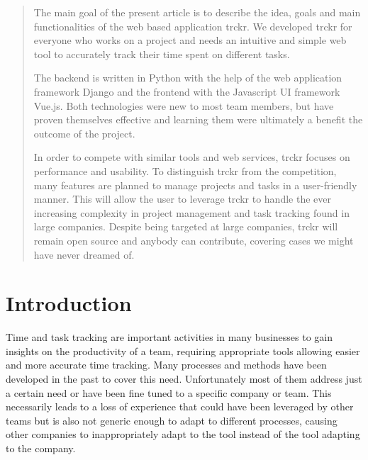 \documentclass[bibliography=totoc, listof=totocnumbered]{scrartcl}
\begin{document}

\begin{abstract}
  The main goal of the present article is to describe the idea, goals and main
  functionalities of the web based application trckr. We developed trckr for
  everyone who works on a project and needs an intuitive and simple web tool to
  accurately track their time spent on different tasks.

  The backend is written in Python with the help of the web application
  framework Django and the frontend with the Javascript UI framework Vue.js.
  Both technologies were new to most team members, but have proven themselves
  effective and learning them were ultimately a benefit the outcome of the
  project.

  In order to compete with similar tools and web services, trckr focuses on
  performance and usability. To distinguish trckr from the competition, many
  features are planned to manage projects and tasks in a user-friendly manner.
  This will allow the user to leverage trckr to handle the ever increasing
  complexity in project management and task tracking found in large companies.
  Despite being targeted at large companies, trckr will remain open source and
  anybody can contribute, covering cases we might have never dreamed of.
\end{abstract}

\clearpage

\setcounter{tocdepth}{2}
\tableofcontents

\clearpage

\section{Introduction}
Time and task tracking are important activities in many businesses to gain
insights on the productivity of a team, requiring appropriate tools allowing
easier and more accurate time tracking. Many processes and methods have been
developed in the past to cover this need. Unfortunately most of them address
just a certain need or have been fine tuned to a specific company or team. This
necessarily leads to a loss of experience that could have been leveraged by
other teams but is also not generic enough to adapt to different processes,
causing other companies to inappropriately adapt to the tool instead of the tool
adapting to the company.
\end{document}
